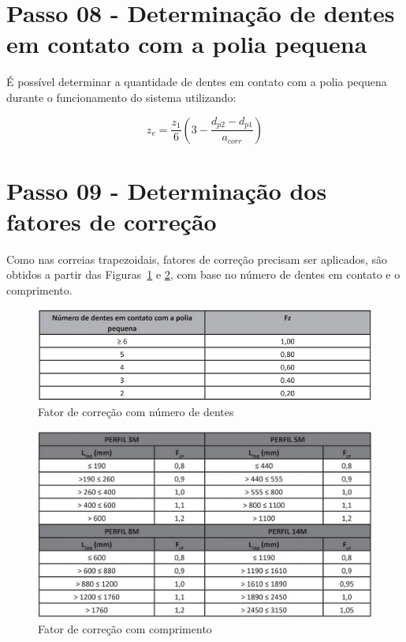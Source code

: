 \section{Passo 08 - Determinação de dentes em contato com a polia pequena}

É possível determinar a quantidade de dentes em contato com a polia pequena durante o funcionamento do sistema utilizando:

\begin{equation}
    z_e=\frac{z_1}{6} \left(3-\frac{d_{p2}-d_{p1}}{a_{corr}} \right)
\end{equation}



\section{Passo 09 - Determinação dos fatores de correção}

Como nas correias trapezoidais, fatores de correção precisam ser aplicados, são obtidos a partir das Figuras~\ref{correcao_dentes} e \ref{correcao_comp2}, com base no número de dentes em contato e o comprimento.

\begin{figure}[h]
	\centering
	\caption{Fator de correção com número de dentes}
    \label{correcao_dentes}
	\includegraphics[scale=0.7]{Imagens/correcao_dentes.png}
\end{figure}

\begin{figure}[h]
	\centering
	\caption{Fator de correção com comprimento}
    \label{correcao_comp2}
	\includegraphics[scale=0.5]{Imagens/correcao_comp2.png}
\end{figure}

